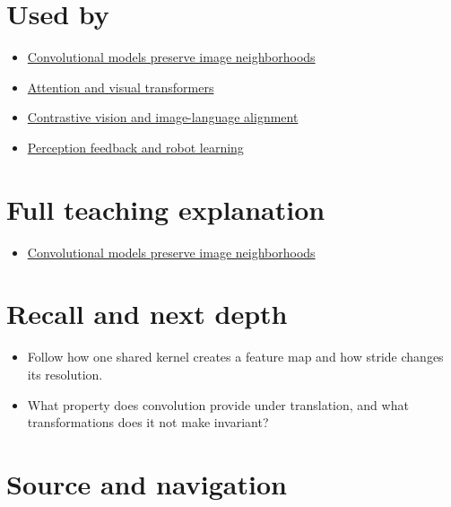 \section{Used by}\label{appendix-47c51ea026fb-used-by}

\begin{itemize}
\tightlist
\item
  \href{Continuous\%20Notes/University\%20-\%20Worlds,\%20Images\%20and\%20Inference\%20-\%20Graphics,\%20Vision\%20and\%20Photography\#Convolutional\%20models\%20preserve\%20image\%20neighborhoods}{Convolutional models preserve image neighborhoods}
\item
  \hyperref[appendix-a9d5dfdd164a]{Attention and visual transformers}
\item
  \hyperref[appendix-772f1fd96148]{Contrastive vision and image-language alignment}
\item
  \hyperref[appendix-b0c42da325f1]{Perception feedback and robot learning}
\end{itemize}

\section{Full teaching explanation}\label{appendix-47c51ea026fb-full-teaching-explanation}

\begin{itemize}
\tightlist
\item
  \href{Continuous\%20Notes/University\%20-\%20Worlds,\%20Images\%20and\%20Inference\%20-\%20Graphics,\%20Vision\%20and\%20Photography\#Convolutional\%20models\%20preserve\%20image\%20neighborhoods}{Convolutional models preserve image neighborhoods}
\end{itemize}

\section{Recall and next depth}\label{appendix-47c51ea026fb-recall-and-next-depth}

\begin{itemize}
\tightlist
\item
  Follow how one shared kernel creates a feature map and how stride changes its resolution.
\item
  What property does convolution provide under translation, and what transformations does it not make invariant?
\end{itemize}

\section{Source and navigation}\label{appendix-47c51ea026fb-source-and-navigation}

